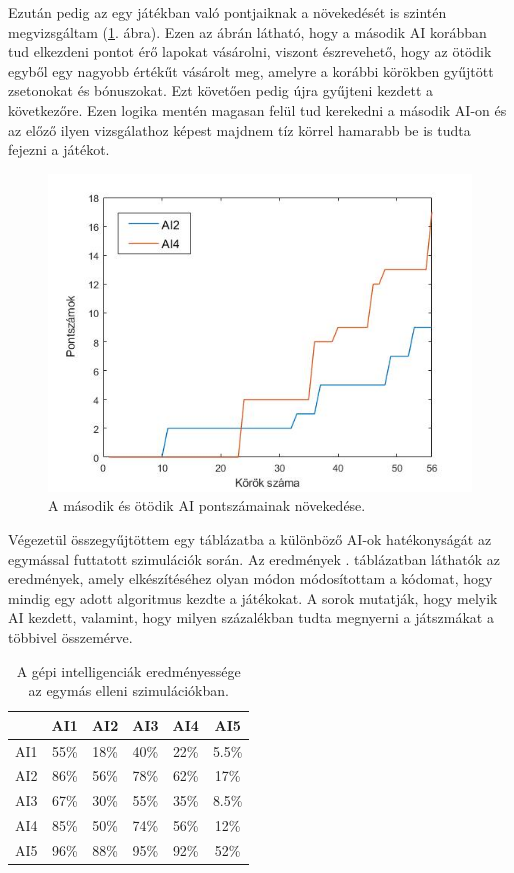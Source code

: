 Ezután pedig az egy játékban való pontjaiknak a növekedését is szintén megvizsgáltam (\ref{fig:player_scores2v5}. ábra). Ezen az ábrán látható, hogy a második AI korábban tud elkezdeni pontot érő lapokat vásárolni, viszont észrevehető, hogy az ötödik egyből egy nagyobb értékűt vásárolt meg, amelyre a korábbi körökben gyűjtött zsetonokat és bónuszokat. Ezt követően pedig újra gyűjteni kezdett a következőre. Ezen logika mentén magasan felül tud kerekedni a második AI-on és az előző ilyen vizsgálathoz képest majdnem tíz körrel hamarabb be is tudta fejezni a játékot.

\begin{figure}[h]
\centering
\includegraphics[scale=0.6]{images/player_points_AI2vsAI5.jpg}
\caption{A második és ötödik AI pontszámainak növekedése.}
\label{fig:player_scores2v5}
\end{figure}



Végezetül összegyűjtöttem egy táblázatba a különböző AI-ok hatékonyságát az egymással futtatott szimulációk során. Az eredmények . táblázatban láthatók az eredmények, amely elkészítéséhez olyan módon módosítottam a kódomat, hogy mindig egy adott algoritmus kezdte a játékokat. A sorok mutatják, hogy melyik AI kezdett, valamint, hogy milyen százalékban tudta megnyerni a játszmákat a többivel összemérve.

\begin{table}[h]
\caption{A gépi intelligenciák eredményessége az egymás elleni szimulációkban.}
\label{tab:ai_comparison}
\medskip
\centering
\begin{tabular}{|c|c|c|c|c|c|} 
 \hline
  & AI1 & AI2 & AI3 & AI4 & AI5 \\ 
 \hline
 AI1 & 55\% & 18\% & 40\% & 22\% & 5.5\%\\ 
 \hline
 AI2 & 86\% & 56\% & 78\% & 62\% & 17\%\\ 
 \hline
 AI3 & 67\% & 30\% & 55\% & 35\% & 8.5\%\\ 
 \hline
 AI4 & 85\% & 50\% & 74\% & 56\% & 12\%\\ 
 \hline
 AI5 & 96\% & 88\% & 95\% & 92\% & 52\%\\
 \hline
\end{tabular}
\end{table}


